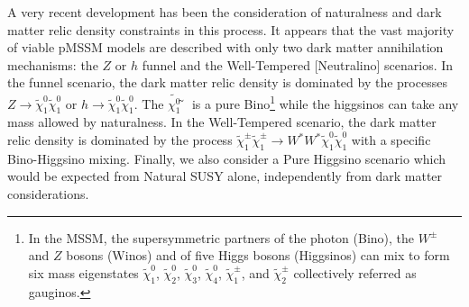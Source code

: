 A very recent development has been the consideration of naturalness
and dark matter relic density constraints in this process. It appears
that the vast majority of viable pMSSM models are described with only
two dark matter annihilation mechanisms: the $Z$ or $h$ funnel and the
Well-Tempered [Neutralino] scenarios\cite{WTN}. In the funnel scenario,
the dark matter relic density is dominated by the processes
$Z\rightarrow \tilde{\chi}_1^0 \tilde{\chi}_1^0$ or $h\rightarrow
\tilde{\chi}_1^0 \tilde{\chi}_1^0$. The $\tilde{\chi_1^0}̃$ is
a pure Bino\footnote{In the MSSM, the supersymmetric partners of the
  photon (Bino), the $W^\pm$ and $Z$ bosons (Winos) and of five Higgs
  bosons (Higgsinos) can mix to form six mass eigenstates
  $\tilde{\chi}_1^0$, $\tilde{\chi}_2^0$, $\tilde{\chi}_3^0$,
  $\tilde{\chi}_4^0$, $\tilde{\chi}_1^\pm$, and $\tilde{\chi}_2^\pm$
  collectively referred as gauginos.} while the higgsinos can take any
mass allowed by naturalness. In the Well-Tempered scenario, the dark
matter relic density is dominated by the process $\tilde{\chi}_1^\pm
\tilde{\chi}_1^\pm \rightarrow W^* W^* \tilde{\chi}_1^0
\tilde{\chi}_1^0$ with a specific Bino-Higgsino mixing. Finally, we
also consider a Pure Higgsino scenario which would be expected from
Natural SUSY alone, independently from dark matter considerations.




